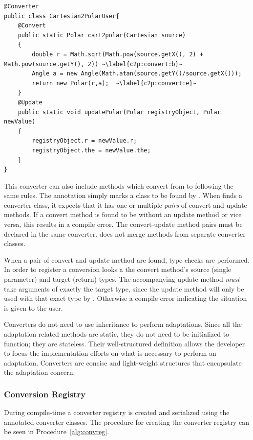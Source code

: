 \begin{lstlisting}[float, caption={A converter defined for converting a Cartesian object to a Polar object}, label={lst:c2pconverter}]
@Converter
public class Cartesian2PolarUser{
	@Convert
	public static Polar cart2polar(Cartesian source)
	{
		double r = Math.sqrt(Math.pow(source.getX(), 2) + Math.pow(source.getY(), 2)) ~\label{c2p:convert:b}~
		Angle a = new Angle(Math.atan(source.getY()/source.getX()));
		return new Polar(r,a);  ~\label{c2p:convert:e}~
	}
	@Update
	public static void updatePolar(Polar registryObject, Polar newValue)
	{
		registryObject.r = newValue.r;
		registryObject.the = newValue.the;
	}
}
\end{lstlisting}

This converter can also include methods which convert from  to  following the same rules. The  annotation simply marks a class to be found by \zamk. When \zamk finds a converter class, it expects that it has one or multiple \emph{pairs} of convert and update methods. If a convert method is found to be without an update method or vice versa, this results in a compile error. The convert-update method pairs must be declared in the same converter. \zamk does not merge methods from separate converter classes. 

When a pair of convert and update method are found, type checks are performed. In order to register a conversion \zamk looks a the convert method's source (single parameter) and target (return) types. 
The accompanying update method \emph{must} take arguments of exactly the target type, since the update method will only be used with that exact type by \zamk. 
Otherwise a compile error indicating the situation is given to the user. 

Converters do not need to use inheritance to perform adaptations.
Since all the adaptation related methods are static, they do not need to be initialized to function; they are stateless.
Their well-structured definition allows the developer to focus the implementation efforts on what is necessary to perform an adaptation. 
Converters are concise and light-weight structures that encapsulate the adaptation concern.

\subsubsection{Conversion Registry}
\label{sec:adapter:convreg}
During compile-time a converter registry is created and serialized using the annotated converter classes. 
The procedure for creating the converter registry can be seen in Procedure~\ref{alg:convreg}. 

